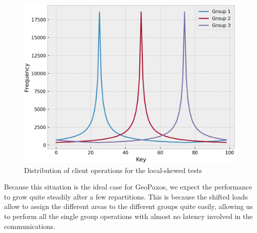 \begin{figure}[!htb]
  \centering
  \includegraphics[width=\textwidth,height=\textheight,keepaspectratio]{img/clients_loads.png}
  \caption{ Distribution of client operations for the local-skewed tests }
  \label{fig:local-skewed-loads}
\end{figure}

Because this situation is the ideal case for GeoPaxos, we expect the performance to grow quite steadily after a few repartitions. This is because the shifted loads allow to assign the different areas to the different groups quite easily, allowing us to perform all the single group operations with almost no latency involved in the communications.


